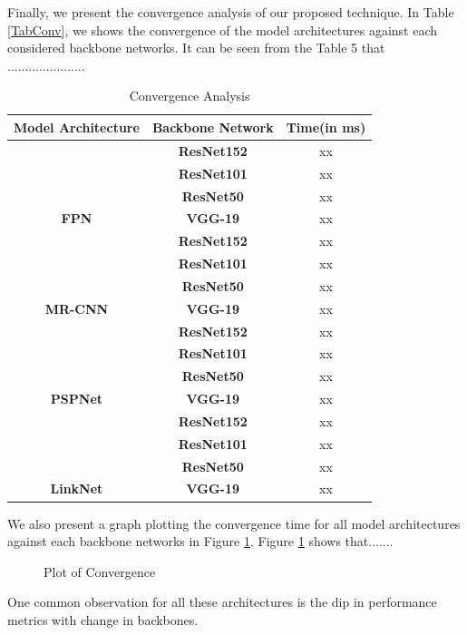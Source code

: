 \documentclass[a4paper,12pt]{spieman}  %
\begin{document}
\begin{spacing}{1}
\begin{figure}[!h]
\end{figure}
\par Finally, we present the convergence analysis of our proposed technique. In Table \ref{TabConv}, we shows the convergence of the model architectures against each considered backbone networks. It can be seen from the Table 5 that ......................
\bgroup
\def\arraystretch{1.1}%
\begin{table}[]
\centering
\caption{Convergence Analysis}
\label{TabConv}
\begin{tabular}{|c|c|c|}
\hline
\textbf{Model Architecture} &
  \textbf{Backbone Network} &
  \textbf{Time(in ms)}   \\ \hline
                                 & \textbf{ResNet152} & xx \\ \cline{2-3}
                                 & \textbf{ResNet101}   & xx  \\ \cline{2-3}
                                 & \textbf{ResNet50}   & xx  \\ \cline{2-3}
\multirow{-4}{*}{\textbf{FPN}}   & \textbf{VGG-19}     & xx  \\ \hline
                                & \textbf{ResNet152}   & xx  \\ \cline{2-3}
                                 & \textbf{ResNet101} & xx  \\ \cline{2-3}
                                 & \textbf{ResNet50}   & xx   \\ \cline{2-3}
\multirow{-4}{*}{\textbf{MR-CNN}} & \textbf{VGG-19}     & xx   \\ \hline
                                  &  \textbf{ResNet152} &    xx   \\ \cline{2-3}
                                  & \textbf{ResNet101}   & xx  \\ \cline{2-3}
                                 & \textbf{ResNet50}   &  xx   \\ \cline{2-3}
\multirow{-4}{*}{\textbf{PSPNet}} & \textbf{VGG-19}     & xx   \\ \hline
{\color[HTML]{222222} }          & \textbf{ResNet152}  &  xx   \\ \cline{2-3}
                                & \textbf{ResNet101}   & xx  \\ \cline{2-3}
{\color[HTML]{222222} }          &   \textbf{ResNet50} &  xx   \\ \cline{2-3}
\multirow{-4}{*}{{\color[HTML]{222222} \textbf{LinkNet}}} & \textbf{VGG-19}     & xx   \\ \hline
\end{tabular}
\label{tab:results2}
\end{table}
\egroup
\par We also present a graph plotting the convergence time for all model architectures against each backbone networks in Figure \ref{ConvFig}. Figure \ref{ConvFig} shows that.......
\begin{figure}[!h]
	\centering
	\caption{\label{ConvFig}Plot of Convergence}
\end{figure}
\par One common observation for all these architectures is the dip in performance metrics with change in backbones.

\end{spacing}
\end{document}
